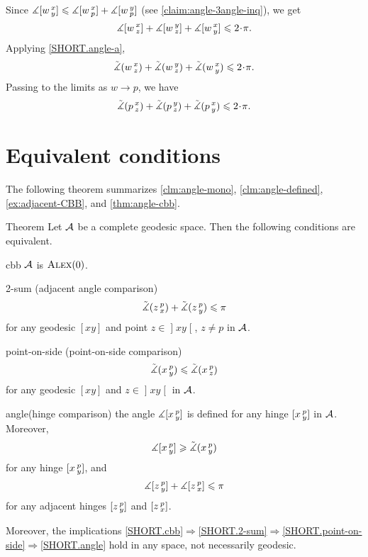 Since $\measuredangle[w\,{}^{x}_{y}]\leqslant \measuredangle[w\,{}^{x}_{p}] +\measuredangle[w\,{}^{y}_{p}]$ (see \ref{claim:angle-3angle-inq}), we get 
\[\mangle\hinge w x z+ \mangle\hinge w y z +\mangle\hinge w x y
\le
2\cdot\pi.\]
Applying \ref{SHORT.angle-a}, 
\[\angk w x z
+ \angk w y z 
+\angk w x y
\le
2\cdot\pi.\]
Passing to the limits as $w\to p$, we have
\[\angk p x z 
+ \angk p y z 
+\angk p x y
\le
2\cdot\pi.\]
\qedsf

\section{Equivalent conditions}

The following theorem summarizes \ref{clm:angle-mono}, \ref{clm:angle-defined}, \ref{ex:adjacent-CBB}, and \ref{thm:angle-cbb}.

\begin{thm}{Theorem}\label{thm:defs_of_alex} 
Let $\mathcal{A}$ be a complete geodesic space.
Then the following conditions are equivalent.

\begin{subthm}{cbb}
$\mathcal{A}$ is $\textsc{Alex}(0)$.
\end{subthm}
 

\begin{subthm}{2-sum} 
(adjacent angle comparison)
\[\tilde\measuredangle(z\,{}^{p}_{x})
+\tilde\measuredangle(z\,{}^{p}_{y})\leqslant \pi\]
for any geodesic $[x y]$ and point $z\in \mathopen{]}x y\mathclose{[}$, $z\ne p$ in $\mathcal{A}$.
\end{subthm}

\begin{subthm}{point-on-side}
(point-on-side comparison)
\[\tilde\measuredangle(x\,{}^{p}_{y})\leqslant\tilde\measuredangle(x\,{}^{p}_{z})\]
for any geodesic $[x y]$ and $z\in \mathopen{]}x y\mathclose{[}$ in $\mathcal{A}$.
\end{subthm}

\begin{subthm}{angle}(hinge comparison)
the angle $\measuredangle[x\,{}^{p}_{y}]$ is defined for any hinge $[x\,{}^{p}_{y}]$ in $\mathcal{A}$.
Moreover, 
\[\measuredangle[x\,{}^{p}_{y}]\geqslant\tilde\measuredangle(x\,{}^{p}_{y})\]
for any hinge $[x\,{}^{p}_{y}]$, and
\[\measuredangle[z\,{}^{p}_{y}] + \measuredangle[z\,{}^{p}_{x}]\leqslant\pi\]
for any adjacent hinges $[z\,{}^{p}_{y}]$ and $[z\,{}^{p}_{x}]$.
\end{subthm}

Moreover, the implications \ref{SHORT.cbb}$\Rightarrow$\ref{SHORT.2-sum}$\Rightarrow$\ref{SHORT.point-on-side}$\Rightarrow$\ref{SHORT.angle} hold in any space, not necessarily geodesic.
\end{thm}

